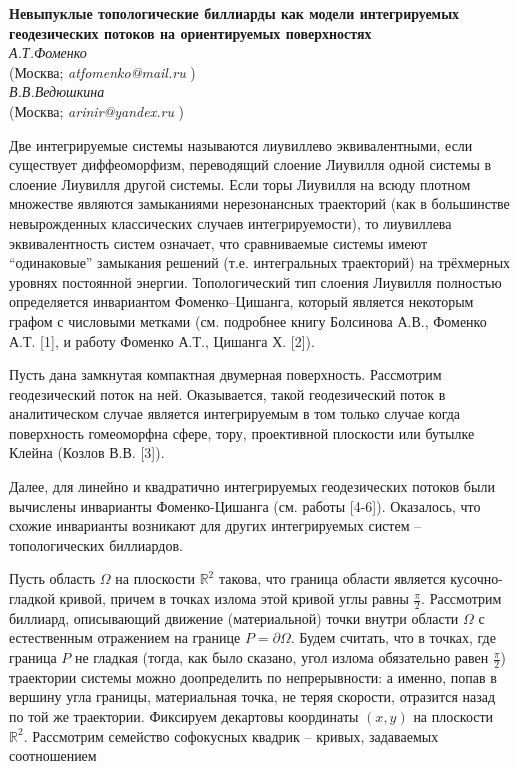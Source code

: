 \begin{center}{ \bf  Невыпуклые топологические биллиарды как модели интегрируемых геодезических потоков на ориентируемых поверхностях}\\
{\it А.Т.Фоменко } \\
(Москва; {\it atfomenko@mail.ru} )\\
{\it В.В.Ведюшкина } \\
(Москва; {\it arinir@yandex.ru} )

\end{center}


Две интегрируемые системы называются лиувиллево эквивалентными, если существует диффеоморфизм, переводящий
слоение Лиувилля одной системы в слоение Лиувилля другой системы. Если
торы Лиувилля на всюду плотном множестве являются замыканиями нерезонансных траекторий (как в большинстве невырожденных  классических случаев интегрируемости), то лиувиллева эквивалентность систем означает, что сравниваемые системы имеют ``одинаковые'' замыкания решений (т.е. интегральных траекторий) на трёхмерных уровнях постоянной энергии.   Топологический тип слоения Лиувилля
полностью определяется инвариантом Фоменко--Цишанга, который является
некоторым графом с числовыми метками (см. подробнее книгу Болсинова А.В., Фоменко А.Т. [1], и работу Фоменко А.Т., Цишанга Х. [2]).

 Пусть дана замкнутая компактная  двумерная поверхность. Рассмотрим геодезический поток на ней. Оказывается, такой геодезический поток в аналитическом случае является интегрируемым в том только случае когда поверхность гомеоморфна сфере, тору, проективной плоскости или бутылке Клейна (Козлов В.В. [3]).

 Далее, для линейно и квадратично  интегрируемых геодезических потоков   были вычислены   инварианты Фоменко-Цишанга (см. работы [4-6]). Оказалось, что схожие инварианты возникают для других интегрируемых систем -- топологических биллиардов.


Пусть  область $\Omega$  на плоскости $\mathbb{R}^2$  такова, что граница области является кусочно-гладкой кривой, причем в точках излома этой кривой углы равны $\frac{\pi}{2}$.
Рассмотрим биллиард, описывающий движение (материальной) точки внутри области $\Omega$ с
естественным отражением на границе $P=\partial \Omega$.    Будем считать, что в точках,
где граница $P$ не гладкая
(тогда, как было сказано,  угол излома обязательно равен $\frac{\pi}{2}$)
 траектории системы можно доопределить по непрерывности: а именно, попав в вершину угла границы, материальная точка, не теряя скорости, отразится назад по той же траектории.
 Фиксируем декартовы координаты $(x,y)$ на плоскости $\mathbb{R}^2.$ Рассмотрим семейство софокусных квадрик -- кривых,  задаваемых соотношением

